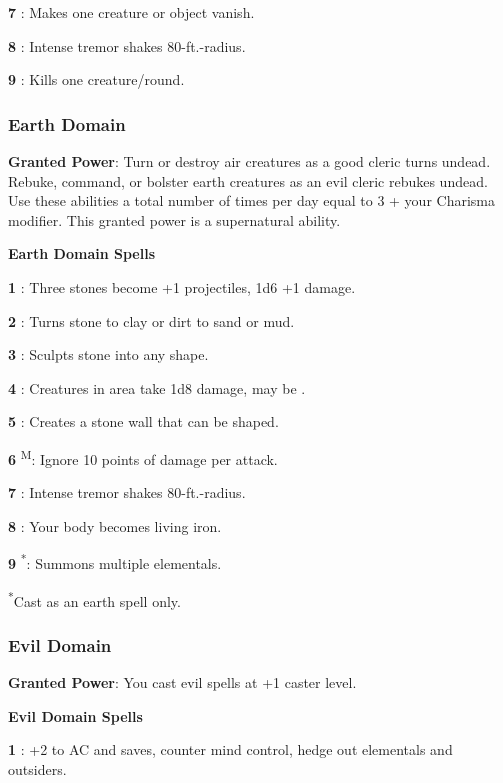 \textbf{7} : Makes one creature or object vanish.

\textbf{8} : Intense tremor shakes 80-ft.-radius.

\textbf{9} : Kills one creature/round.

\subsubsection{Earth Domain}

\textbf{Granted Power}: Turn or destroy air creatures as a good cleric turns undead. Rebuke, command, or bolster earth creatures as an evil cleric rebukes undead. Use these abilities a total number of times per day equal to 3 + your Charisma modifier. This granted power is a supernatural ability.

\textbf{Earth Domain Spells}

\textbf{1} : Three stones become +1 projectiles, 1d6 +1 damage.

\textbf{2} : Turns stone to clay or dirt to sand or mud.

\textbf{3} : Sculpts stone into any shape.

\textbf{4} : Creatures in area take 1d8 damage, may be .

\textbf{5} : Creates a stone wall that can be shaped.

\textbf{6} \textsuperscript{M}: Ignore 10 points of damage per attack.

\textbf{7} : Intense tremor shakes 80-ft.-radius.

\textbf{8} : Your body becomes living iron.

\textbf{9} \textsuperscript{*}: Summons multiple elementals.

\textsuperscript{*}Cast as an earth spell only.

\subsubsection{Evil Domain}

\textbf{Granted Power}: You cast evil spells at +1 caster level.

\textbf{Evil Domain Spells}

\textbf{1} : +2 to AC and saves, counter mind control, hedge out elementals and outsiders.

